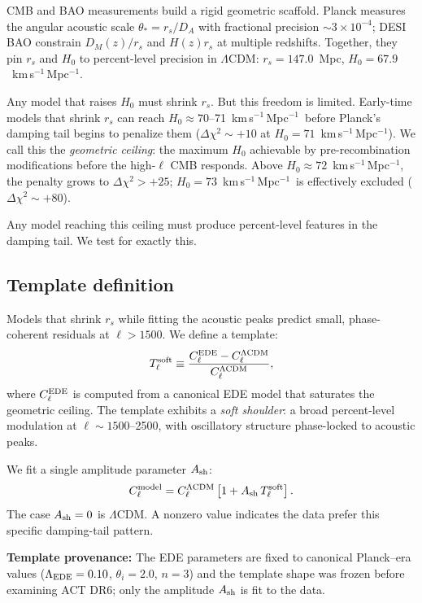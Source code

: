 \documentclass[twocolumn,showpacs,preprintnumbers,amsmath,amssymb,prd]{revtex4-2}
\newcommand{\lcdm}{$\Lambda$CDM}
\newcommand{\kms}{km\,s$^{-1}$\,Mpc$^{-1}$}
\begin{document}
CMB and BAO measurements build a rigid geometric scaffold. Planck measures 
the angular acoustic scale $\theta_* = r_s/D_A$ with fractional precision 
$\sim 3 \times 10^{-4}$; DESI BAO constrain $D_M(z)/r_s$ and $H(z) r_s$ at 
multiple redshifts. Together, they pin $r_s$ and $H_0$ to percent-level 
precision in \lcdm: $r_s = 147.0$~Mpc, $H_0 = 67.9$~\kms.

Any model that raises $H_0$ must shrink $r_s$. But this freedom is limited. 
Early-time models that shrink $r_s$ can reach $H_0 \approx 70$--71~\kms\ before 
Planck's damping tail begins to penalize them ($\Delta\chi^2 \sim +10$ at 
$H_0 = 71$~\kms). We call this the \emph{geometric ceiling}: the maximum $H_0$ 
achievable by pre-recombination modifications before the high-$\ell$ CMB 
responds. Above $H_0 \approx 72$~\kms, the penalty grows to $\Delta\chi^2 > +25$; 
$H_0 = 73$~\kms\ is effectively excluded ($\Delta\chi^2 \sim +80$).

Any model reaching this ceiling must produce percent-level features in the 
damping tail. We test for exactly this.

\subsection{Template definition}
\label{subsec:template}

Models that shrink $r_s$ while fitting the acoustic peaks predict small, 
phase-coherent residuals at $\ell > 1500$. We define a template:
\begin{equation}
    T_\ell^{\rm soft} \equiv \frac{C_\ell^{\rm EDE} - C_\ell^{\rm \Lambda CDM}}{C_\ell^{\rm \Lambda CDM}},
    \label{eq:template}
\end{equation}
where $C_\ell^{\rm EDE}$ is computed from a canonical EDE model \cite{Poulin2019} 
that saturates the geometric ceiling. The template exhibits a \emph{soft shoulder}: 
a broad percent-level modulation at $\ell \sim 1500$--2500, with oscillatory 
structure phase-locked to acoustic peaks.

We fit a single amplitude parameter $A_{\rm sh}$:
\begin{equation}
    C_\ell^{\rm model} = C_\ell^{\rm \Lambda CDM} \left[ 1 + A_{\rm sh}\, T_\ell^{\rm soft} \right].
    \label{eq:ash}
\end{equation}
The case $A_{\rm sh} = 0$ is \lcdm. A nonzero value indicates the data prefer 
this specific damping-tail pattern.

\textbf{Template provenance:} The EDE parameters are fixed to canonical 
Planck--era values ($\Lambda_{\rm EDE} = 0.10$, $\theta_i = 2.0$, $n = 3$) 
and the template shape was frozen before examining ACT DR6; only the amplitude 
$A_{\rm sh}$ is fit to the data.
\end{document}
